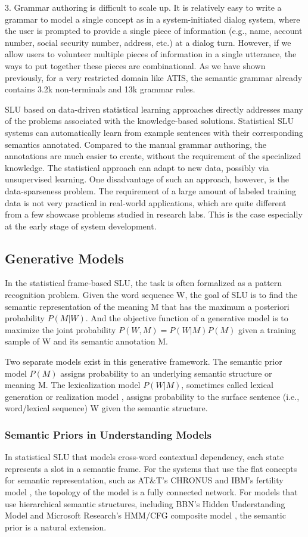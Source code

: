 3. Grammar authoring is difficult to scale up. It is relatively easy to write a grammar
to model a single concept as in a system-initiated dialog system, where the user
is prompted to provide a single piece of information (e.g., name, account number,
social security number, address, etc.) at a dialog turn. However, if we allow users to
volunteer multiple pieces of information in a single utterance, the ways to put together
these pieces are combinational. As we have shown previously, for a very restricted
domain like ATIS, the semantic grammar already contains 3.2k non-terminals and 13k
grammar rules.

SLU based on data-driven statistical learning approaches directly addresses many of
the problems associated with the knowledge-based solutions. Statistical SLU systems can
automatically learn from example sentences with their corresponding semantics annotated.
Compared to the manual grammar authoring, the annotations are much easier to create,
without the requirement of the specialized knowledge. The statistical approach can adapt
to new data, possibly via unsupervised learning. One disadvantage of such an approach,
however, is the data-sparseness problem. The requirement of a large amount of labeled
training data is not very practical in real-world applications, which are quite different from a
few showcase problems studied in research labs. This is the case especially at the early stage
of system development.

\subsection{Generative Models}
In the statistical frame-based SLU, the task is often formalized as a pattern recognition
problem. Given the word sequence W, the goal of SLU is to find the semantic representation
of the meaning M that has the maximum a posteriori probability $P(M|W)$.
And the objective function of a generative model is to maximize the joint probability
$P(W, M) = P(W | M)P(M)$ given a training sample of W and its semantic annotation
M.

Two separate models exist in this generative framework. The semantic prior model $P(M)$
assigns probability to an underlying semantic structure or meaning M. The lexicalization
model $P(W | M)$, sometimes called lexical generation or realization model \cite{d1e218}, assigns probability to the surface sentence (i.e., word/lexical sequence) W given the
semantic structure.

\subsubsection{Semantic Priors in Understanding Models}
In statistical SLU that models cross-word contextual dependency, each state represents
a slot in a semantic frame. For the systems that use the flat concepts for semantic
representation, such as AT\&T’s CHRONUS \cite{d1e252} and IBM’s fertility
model \cite{d1e114}, the topology of the model is a fully connected network.
For models that use hierarchical semantic structures, including BBN’s Hidden
Understanding Model \cite{d1e218} and Microsoft Research’s HMM/CFG composite
model \cite{d1e473}, the semantic prior is a natural extension.

